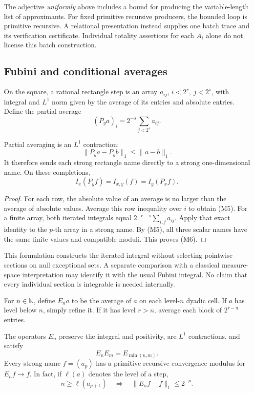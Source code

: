 The adjective \emph{uniformly} above includes a bound for producing the
variable-length list of approximants.  For fixed primitive recursive
producers, the bounded loop is primitive recursive.  A relational
presentation instead supplies one batch trace and its verification
certificate.  Individual totality assertions for each \(A_i\) alone do not
license this batch construction.

\subsection{Fubini and conditional averages}

On the square, a rational rectangle step is an array
\(a_{ij}\), \(i<2^r,\ j<2^s\), with integral and \(L^1\) norm given by the
average of its entries and absolute entries.  Define the partial average
\[
 (P_y a)_i=2^{-s}\sum_{j<2^s}a_{ij}.
\]

\begin{theorem}\label{m:fubini}
Partial averaging is an \(L^1\) contraction:
\[
 \|P_y a-P_y b\|_1\le\|a-b\|_1.
 \tag{M5}
\]
It therefore sends each strong rectangle name directly to a strong
one-dimensional name.  On these completions,
\[
 I_x(P_y f)=I_{x,y}(f)=I_y(P_x f).
 \tag{M6}
\]
\end{theorem}

\begin{proof}
For each row, the absolute value of an average is no larger than the average
of absolute values.  Average this row inequality over \(i\) to obtain (M5).
For a finite array, both iterated integrals equal
\(2^{-r-s}\sum_{i,j}a_{ij}\).  Apply that exact identity to the \(p\)-th
array in a strong name.  By (M5), all three scalar names have the same
finite values and compatible moduli.  This proves (M6).
\end{proof}

This formulation constructs the iterated integral without selecting
pointwise sections on null exceptional sets.  A separate comparison with a
classical measure-space interpretation may identify it with the usual
Fubini integral.  No claim that every individual section is integrable is
needed internally.

For \(n\in\mathbb N\), define \(E_n a\) to be the average of \(a\) on each
level-\(n\) dyadic cell.  If \(a\) has level below \(n\), simply refine it.
If it has level \(r>n\), average each block of \(2^{r-n}\) entries.

\begin{theorem}\label{m:tower}
The operators \(E_n\) preserve the integral and positivity, are \(L^1\)
contractions, and satisfy
\[
 E_nE_m=E_{\min(n,m)}.
 \tag{M7}
\]
Every strong name \(f=(a_p)\) has a primitive recursive convergence modulus
for \(E_n f\to f\).  In fact, if \(\ell(a)\) denotes the level of a step,
\[
 n\ge\ell(a_{p+1})
 \quad\Longrightarrow\quad
 \|E_n f-f\|_1\le2^{-p}.
 \tag{M8}
\]
\end{theorem}

